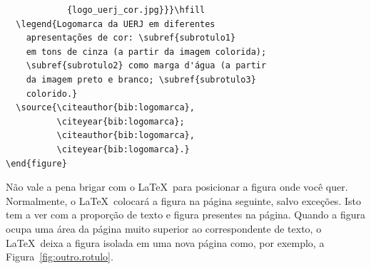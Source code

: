 \documentclass[a4paper,12pt,oneside,onecolumn,final,fleqn]{repUERJ}
\begin{document}
\begin{verbatim}
            {logo_uerj_cor.jpg}}}\hfill
  \legend{Logomarca da UERJ em diferentes 
    apresentações de cor: \subref{subrotulo1} 
    em tons de cinza (a partir da imagem colorida);
    \subref{subrotulo2} como marga d'água (a partir 
    da imagem preto e branco; \subref{subrotulo3} 
    colorido.}
  \source{\citeauthor{bib:logomarca}, 
          \citeyear{bib:logomarca}; 
          \citeauthor{bib:logomarca}, 
          \citeyear{bib:logomarca}.}
\end{figure}
\end{verbatim}

Não vale a pena brigar com o \LaTeX\ para posicionar a figura onde você quer. Normalmente, o \LaTeX\ colocará a figura na página seguinte, salvo exceções. Isto tem  a ver com a proporção de texto e figura presentes na página. Quando a figura ocupa uma área da página muito superior ao correspondente de texto, o \LaTeX\ deixa a figura isolada em uma nova página como, por exemplo, a Figura~\ref{fig:outro.rotulo}.
\end{document}
